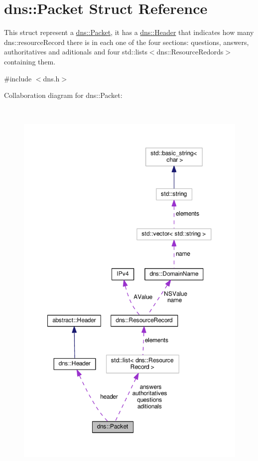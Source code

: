 \hypertarget{structdns_1_1Packet}{}\section{dns\+:\+:Packet Struct Reference}
\label{structdns_1_1Packet}


This struct represent a \hyperlink{structdns_1_1Packet}{dns\+::\+Packet}, it has a \hyperlink{structdns_1_1Header}{dns\+::\+Header} that indicates how many dns\+::resource\+Record there is in each one of the four sections\+: questions, answers, authoritatives and aditionals and four std\+::lists$<$dns\+::\+Resource\+Redords$>$ containing them.  




{\ttfamily \#include $<$dns.\+h$>$}



Collaboration diagram for dns\+:\+:Packet\+:
\nopagebreak
\begin{figure}[H]
\begin{center}
\leavevmode
\includegraphics[height=550pt]{structdns_1_1Packet__coll__graph}
\end{center}
\end{figure}
